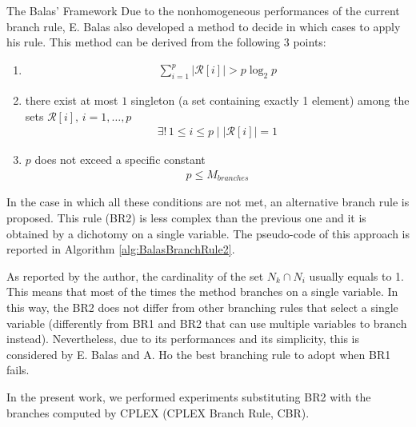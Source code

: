 \documentclass[a4paper,12pt]{mydeitesi_eng}
\begin{document}
\begin{chapter}{The Balas' Framework}
Due to the nonhomogeneous performances of the current branch rule, E. Balas also developed a method to decide in which cases to apply his rule.
This method can be derived from the following $3$ points:
\begin{enumerate}
\item
\begin{align}
\sum_{i=1}^p \left| \mathcal{R}[i] \right| > p \log_2 p
\label{eqn:BranchCond1}
\end{align}
\item there exist at most $1$ singleton (a set containing exactly 1 element) among the sets $\mathcal{R}[i], \, i = 1,\dots, p$
\begin{align}
\exists ! \, 1\leq i \leq p \mid \left| \mathcal{R}[i] \right| = 1
\end{align}
\item $p$ does not exceed a specific constant
\begin{align}
p \le M_{branches}
\label{eqn:BranchCond3}
\end{align}
\end{enumerate}

In the case in which all these conditions are not met, an alternative branch rule is proposed.
This rule (BR2) is less complex than the previous one and it is obtained by a  dichotomy on a single variable.
The pseudo-code of this approach is reported in Algorithm \ref{alg:BalasBranchRule2}.

As reported by the author, the cardinality of the set $N_k \cap N_i$ usually equals to 1.
This means that most of the times the method branches on a single variable.
In this way, the BR2 does not differ from other branching rules that select a single variable (differently from BR1 and BR2 that can use multiple variables to branch instead). 
Nevertheless, due to its performances and its simplicity, this is considered by E. Balas and A. Ho the best branching rule to adopt when BR1 fails.

In the present work, we performed experiments substituting BR2 with the branches computed by CPLEX (CPLEX Branch Rule, CBR).\\

\begin{algorithm}[h]
\AlgoDontDisplayBlockMarkers
\SetAlgoNoEnd
\DontPrintSemicolon
\LinesNumbered


\end{algorithm}
\end{chapter}
\end{document}
